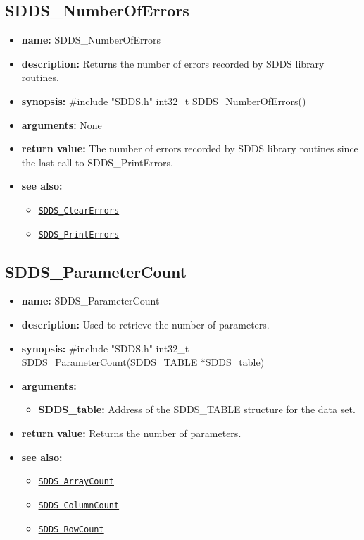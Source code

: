\documentclass[11pt]{article}
\newcommand{\progref}[1]{\hyperref[SDDS_#1]{\tt SDDS\_#1}}
\begin{document}
\subsection{SDDS\_NumberOfErrors}
\label{SDDS_NumberOfErrors}

\begin{itemize}
\item {\bf name:}\newline
SDDS\_NumberOfErrors
\item {\bf description:}\newline
Returns the number of errors recorded by SDDS library routines.
\item {\bf synopsis:} \#include "SDDS.h"\newline
int32\_t SDDS\_NumberOfErrors()
\item {\bf arguments:}\newline
None
\item {\bf return value:}\newline
The number of errors recorded by SDDS library routines since the last call to SDDS\_PrintErrors.
\item {\bf see also:}
\begin{itemize}
\item \progref{ClearErrors}
\item \progref{PrintErrors}
\end{itemize}
\end{itemize}

\subsection{SDDS\_ParameterCount}
\label{SDDS_ParameterCount}

\begin{itemize}
\item {\bf name:}\newline
SDDS\_ParameterCount
\item {\bf description:}\newline
Used to retrieve the number of parameters.
\item {\bf synopsis:} \#include "SDDS.h"\newline
int32\_t SDDS\_ParameterCount(SDDS\_TABLE *SDDS\_table)
\item {\bf arguments:}
\begin{itemize}
\item {\bf SDDS\_table:} Address of the SDDS\_TABLE structure for the data set.
\end{itemize}
\item {\bf return value:}\newline
Returns the number of parameters.
\item {\bf see also:}
\begin{itemize}
\item \progref{ArrayCount}
\item \progref{ColumnCount}
\item \progref{RowCount}
\end{itemize}
\end{itemize}
\end{document}
